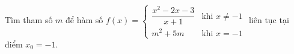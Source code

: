 \begin{ex}
Tìm tham số $m$ để hàm số $f(x)=\begin{cases}\dfrac{x^2-2x-3}{x+1}&\text{khi }x\ne-1\\m^2+5m&\text{khi }x=-1\end{cases}$ liên tục tại điểm $x_0=-1$.
\end{ex}
